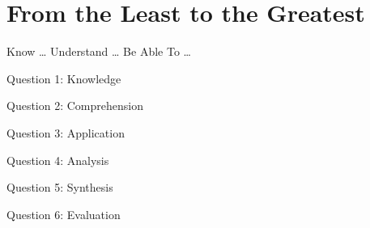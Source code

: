 \chapter{From the Least to the Greatest}


\begin{goals}
\goal Know \ldots
\goal Understand \ldots
\goal Be Able To \ldots
\end{goals}

\intro

\lipsum[4]

\bible

\begin{quote}
\lipsum[4] 
\end{quote}

\begin{quote}
\lipsum[4] 
\end{quote}

\begin{quote}
\lipsum[4] 
\end{quote}

\begin{quote}
\lipsum[4] 
\end{quote}

\discussion

\lipsum[5-7]

\questions

Question 1: Knowledge
\vfill

Question 2: Comprehension
\vfill

Question 3: Application
\vfill

Question 4: Analysis
\vfill

Question 5: Synthesis
\vfill

Question 6: Evaluation
\vfill